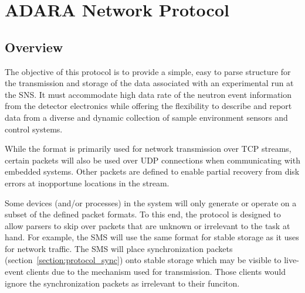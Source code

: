 
\section{ADARA Network Protocol}
\label{network_protocol}

\subsection{Overview}

The objective of this protocol is to provide a simple, easy to parse
structure for the transmission and storage of the data associated with
an experimental run at the SNS. It must accommodate high data rate of the
neutron event information from the detector electronics while offering
the flexibility to describe and report data from a diverse and dynamic
collection of sample environment sensors and control systems.

While the format is primarily used for network transmission over TCP
streams, certain packets will also be used over UDP connections when
communicating with embedded systems. Other packets are defined to enable
partial recovery from disk errors at inopportune locations in the stream.

Some devices (and/or processes) in the system will only generate or operate on
a subset of the defined packet formats.  To this end, the protocol is designed
to allow parsers to skip over packets that are unknown or irrelevant to the
task at hand.  For example, the SMS will use the same format for stable storage
as it uses for network traffic. The SMS will place synchronization packets
(section~\ref{section:protocol_sync}) onto stable storage which may be visible
to live-event clients due to the mechanism used for transmission.  Those
clients would ignore the synchronization packets as irrelevant to their
funciton.


